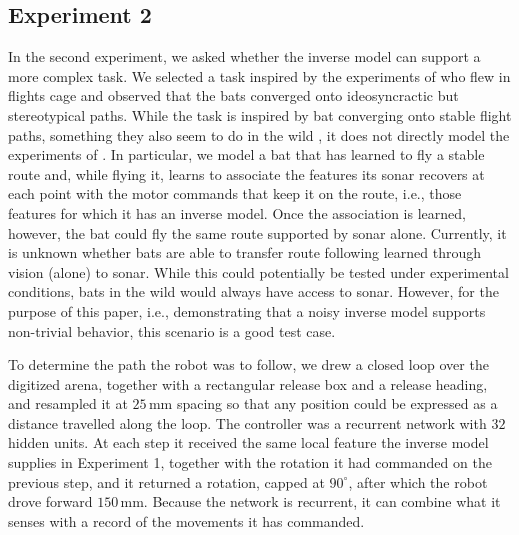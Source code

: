 \documentclass[11pt]{article}
\begin{document}
\subsection{Experiment 2}


In the second experiment, we asked whether the inverse model can support a more complex task. We selected a task inspired by the experiments of \citet{Barchi2013} who flew  in flights cage and observed that the bats converged onto ideosyncractic but stereotypical paths. While the task is inspired by bat converging onto stable flight paths, something they also seem to do in the wild \citep{Holderied2006}, it does not directly model the experiments of \citet{Barchi2013}. In particular, we model a bat that has learned to fly a stable route and, while flying it, learns to associate the features its sonar recovers at each point with the motor commands that keep it on the route, i.e., those features for which it has an inverse model. Once the association is learned, however, the bat could fly the same route supported by sonar alone. Currently, it is unknown whether bats are able to transfer route following learned through vision (alone) to sonar. While this could potentially be tested under experimental conditions, bats in the wild would always have access to sonar. However, for the purpose of this paper, i.e., demonstrating that a noisy inverse model supports non-trivial behavior, this scenario is a good test case.


To determine the path the robot was to follow, we drew a closed loop over the digitized arena, together with a rectangular release box and a release heading, and resampled it at $25$\,mm spacing so that any position could be expressed as a distance travelled along the loop. The controller was a recurrent network with $32$ hidden units. At each step it received the same local feature the inverse model supplies in Experiment 1, together with the rotation it had commanded on the previous step, and it returned a rotation, capped at $90^{\circ}$, after which the robot drove forward $150$\,mm. Because the network is recurrent, it can combine what it senses with a record of the movements it has commanded.
\end{document}
